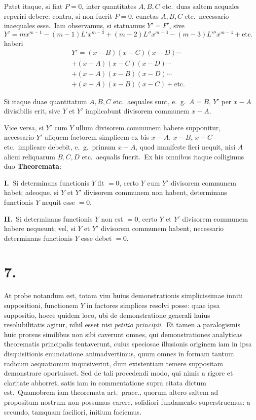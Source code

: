 \documentclass[12pt,a4paper]{article}
\theoremstyle{plain}
\begin{document}
Patet itaque, si fiat $P = 0$, inter quantitates $A, B, C$ etc.\ duas saltem aequales reperiri debere; contra, si non fuerit $P = 0$, cunctas $A, B, C$ etc.\ necessario inaequales esse.\ Iam observamus, si statuamus $Y' = F'$, sive
\[
Y' = mx^{m-1} - (m-1)L'x^{m-2} + (m-2)L''x^{m-3} - (m-3)L'''x^{m-4} + \text{etc.}
\]
haberi
\begin{multline*}
Y' = (x-B)(x-C)(x-D) \cdots \\
+ (x-A)(x-C)(x-D) \cdots \\
+ (x-A)(x-B)(x-D) \cdots \\
+ (x-A)(x-B)(x-C) + \text{etc.}
\end{multline*}

Si itaque duae quantitatum $A, B, C$ etc.\ aequales sunt, e.\ g.\ $A = B$, $Y'$ per
$x - A$ divisibilis erit, sive $Y$ et $Y'$ implicabunt divisorem communem $x - A$.

Vice versa, si $Y'$ cum $Y$ ullum divisorem communem habere supponitur, necessario $Y'$ aliquem factorem simplicem ex bis $x - A$, $x - B$, $x - C$ etc.\ implicare
debebit, e.\ g.\ primum $x - A$, quod manifeste fieri nequit, nisi $A$ alicui reliquarum $B, C, D$ etc.\ aequalis fuerit.\ Ex his omnibus itaque colligimus duo
\textbf{Theoremata}:

\textbf{I.}\ Si determinans functionis $Y$ fit $= 0$, certo $Y$ cum $Y'$ divisorem communem habet; adeoque, si $Y$ et $Y'$ divisorem communem non habent, determinans functionis $Y$ nequit esse $= 0$.

\textbf{II.}\ Si determinans functionis $Y$ non est $= 0$, certo $Y$ et $Y'$ divisorem communem habere nequeunt; vel, si $Y$ et $Y'$ divisorem communem habent, necessario determinans functionis $Y$ esse debet $= 0$.

\section*{7.}

At probe notandum est, totam vim huius demonstrationis simplicissimae inniti suppositioni, functionem $Y$ in factores simplices resolvi posse: quae ipsa suppositio, hocce quidem loco, ubi de demonstratione generali huius resolubilitatis
agitur, nihil esset nisi \textit{petitio principii}.\ Et tamen a paralogismis huic prorsus similibus non sibi caverunt omnes, qui demonstrationes analyticas theorematis principalis tentaverunt, cuius speciosae illusionis originem iam in ipsa disquisitionis
enunciatione animadvertimus, quum omnes in formam tantum radicum aequationum inquisiverint, dum existentiam temere suppositam demonstrare oportuisset.
Sed de tali procedendi modo, qui nimis a rigore et claritate abhorret, satis iam in
commentatione supra citata dictum est.\ Quamobrem iam theoremata art.\ praec.,
quorum altero saltem ad propositum nostrum non possumus carere, solidiori fundamento superstruemus: a secundo, tamquam faciliori, initium faciemus.
\end{document}
